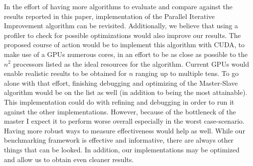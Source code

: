 In the effort of having more algorithms to evaluate and compare against the results reported in this paper, implementation of the Parallel Iterative Improvement algorithm can be revisited. Additionally, we believe that using a profiler to check for possible optimizations would also improve our results. The proposed course of action would be to implement this algorithm with CUDA, to make use of a GPUs numerous cores, in an effort to be as close as possible to the $n^2$ processors listed as the ideal resources for the algorithm. Current GPUs would enable realistic results to be obtained for $n$ ranging  up to multiple tens.
To go alone with that effort, finishing debugging and optimizing of the Master-Slave algorithm would be on the list as well (in addition to being the most attainable). This implementation could do with refining and debugging in order to run it against the other implementations. However, because of the bottleneck of the master I expect it to perform worse overall especially in the worst case-scenario.
Having more robust ways to measure effectiveness would help as well. While our benchmarking framework is effective and informative, there are always other things that can be looked. In addition, our implementations may be optimized and allow us to obtain even cleaner results.